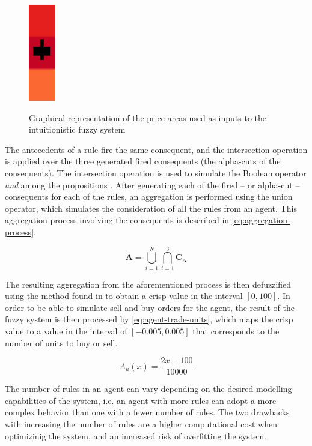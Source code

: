 \begin{figure}
\caption{Graphical representation of the price areas used as inputs to the
  intuitionistic fuzzy system} \centering
\includegraphics[height=0.2\textwidth]{img/areas-for-ifis.png}
\label{figure:areas-for-ifis}
\end{figure}

The antecedents of a rule fire the same consequent, and the intersection
operation is applied over the three generated fired consequents (the alpha-cuts
of the consequents). The intersection operation is used to simulate the Boolean
operator \textit{and} among the propositions \cite{Atanassov1986}. After
generating each of the fired -- or alpha-cut -- consequents for each of the rules,
an aggregation is performed using the union operator, which simulates the
consideration of all the rules from an agent. This aggregation process involving
the consequents is described in \ref{eq:aggregation-process}.

\begin{equation}
  \bm{A} = \bigcup\limits_{i=1}^{N} \bigcap\limits_{i=1}^{3} \bm{C_{\alpha}}
\end{equation}

The resulting aggregation from the aforementioned process is then
defuzzified using the method found in \cite{Hernandez-Aguila2017} to obtain a
crisp value in the interval $[0, 100]$. In order to be able to simulate sell and
buy orders for the agent, the result of the fuzzy system is then processed by
\ref{eq:agent-trade-units}, which maps the crisp value to a value in the
interval of $[-0.005, 0.005]$ that corresponds to the number of units to buy or
sell.

\begin{equation}
  \label{eq:agent-trade-units}
  A_u(x) = \frac{2x - 100}{10000}
\end{equation}

The number of rules in an agent can vary depending on the desired modelling
capabilities of the system, i.e. an agent with more rules can adopt a more
complex behavior than one with a fewer number of rules. The two drawbacks with
increasing the number of rules are a higher computational cost when optimizinig
the system, and an increased risk of overfitting the system. %

